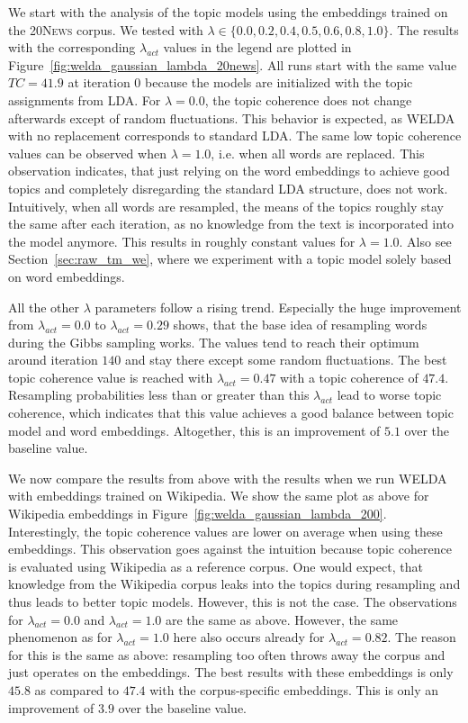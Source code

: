 \documentclass[
        a4paper,
        titlepage,
        twoside,
        parskip,
        numbers=noenddot
        ]{scrbook}
\theoremstyle{break}
\begin{document}
We start with the analysis of the topic models using the embeddings trained on the \textsc{20News} corpus.
We tested with $\lambda \in \{ 0.0, 0.2, 0.4, 0.5, 0.6, 0.8, 1.0 \}$.
The results with the corresponding $\lambda_{act}$ values in the legend are plotted in Figure~\ref{fig:welda_gaussian_lambda_20news}.
All runs start with the same value $TC = 41.9$ at iteration 0 because the models are initialized with the topic assignments from LDA.
For $\lambda = 0.0$, the topic coherence does not change afterwards except of random fluctuations.
This behavior is expected, as WELDA with no replacement corresponds to standard LDA.
The same low topic coherence values can be observed when $\lambda = 1.0$, i.e. when all words are replaced.
This observation indicates, that just relying on the word embeddings to achieve good topics and completely disregarding the standard LDA structure, does not work.
Intuitively, when all words are resampled, the means of the topics roughly stay the same after each iteration, as no knowledge from the text is incorporated into the model anymore.
This results in roughly constant values for $\lambda = 1.0$.
Also see Section~\ref{sec:raw_tm_we}, where we experiment with a topic model solely based on word embeddings.

All the other $\lambda$ parameters follow a rising trend.
Especially the huge improvement from $\lambda_{act} = 0.0$ to $\lambda_{act} = 0.29$ shows, that the base idea of resampling words during the Gibbs sampling works.
The values tend to reach their optimum around iteration $140$ and stay there except some random fluctuations.
The best topic coherence value is reached with $\lambda_{act} = 0.47$ with a topic coherence of $47.4$.
Resampling probabilities less than or greater than this $\lambda_{act}$ lead to worse topic coherence, which indicates that this value achieves a good balance between topic model and word embeddings.
Altogether, this is an improvement of $5.1$ over the baseline value.

We now compare the results from above with the results when we run WELDA with embeddings trained on Wikipedia.
We show the same plot as above for Wikipedia embeddings in Figure~\ref{fig:welda_gaussian_lambda_200}.
Interestingly, the topic coherence values are lower on average when using these embeddings.
This observation goes against the intuition because topic coherence is evaluated using Wikipedia as a reference corpus.
One would expect, that knowledge from the Wikipedia corpus leaks into the topics during resampling and thus leads to better topic models.
However, this is not the case.
The observations for $\lambda_{act} = 0.0$ and $\lambda_{act} = 1.0$ are the same as above.
However, the same phenomenon as for $\lambda_{act} = 1.0$ here also occurs already for $\lambda_{act} = 0.82$.
The reason for this is the same as above: resampling too often throws away the corpus and just operates on the embeddings.
The best results with these embeddings is only $45.8$ as compared to $47.4$ with the corpus-specific embeddings.
This is only an improvement of $3.9$ over the baseline value.
\end{document}
